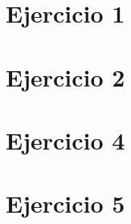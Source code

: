 







\tableofcontents
\newpage


\section{Ejercicio 1}
	\label{Ejercicio-1}
	
		
\section{Ejercicio 2}
	\label{Ejercicio-2}
		

%	

\section{Ejercicio 4}
	\label{Ejercicio-4}
	

\section{Ejercicio 5}
	\label{Ejercicio-5}
	
	


